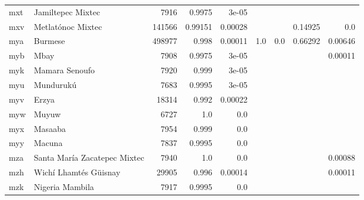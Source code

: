 \documentclass[11pt]{article}
\begin{document}
\begin{table*}[h]
{\begin{tabular}{llrrrrrrr}
mxt         & Jamiltepec Mixtec         & 7916         & 0.9975         & 3e-05         &          &          &          &          \\

mxv         & Metlatónoc Mixtec         & 141566         & 0.99151         & 0.00028         &          &          & 0.14925         & 0.0         \\

mya         & Burmese         & 498977         & 0.998         & 0.00011         & 1.0         & 0.0         & 0.66292         & 0.00646         \\

myb         & Mbay         & 7908         & 0.9975         & 3e-05         &          &          &          & 0.00011         \\

myk         & Mamara Senoufo         & 7920         & 0.999         & 3e-05         &          &          &          &          \\

myu         & Mundurukú         & 7683         & 0.9995         & 3e-05         &          &          &          &          \\

myv         & Erzya         & 18314         & 0.992         & 0.00022         &          &          &          &          \\

myw         & Muyuw         & 6727         & 1.0         & 0.0         &          &          &          &          \\

myx         & Masaaba         & 7954         & 0.999         & 0.0         &          &          &          &          \\

myy         & Macuna         & 7837         & 0.9995         & 0.0         &          &          &          &          \\

mza         & Santa María Zacatepec Mixtec         & 7940         & 1.0         & 0.0         &          &          &          & 0.00088         \\

mzh         & Wichí Lhamtés Güisnay         & 29905         & 0.996         & 0.00014         &          &          &          & 0.00011         \\

mzk         & Nigeria Mambila         & 7917         & 0.9995         & 0.0         &          &          &          &          \\


\end{tabular}}
\end{table*}
\end{document}
